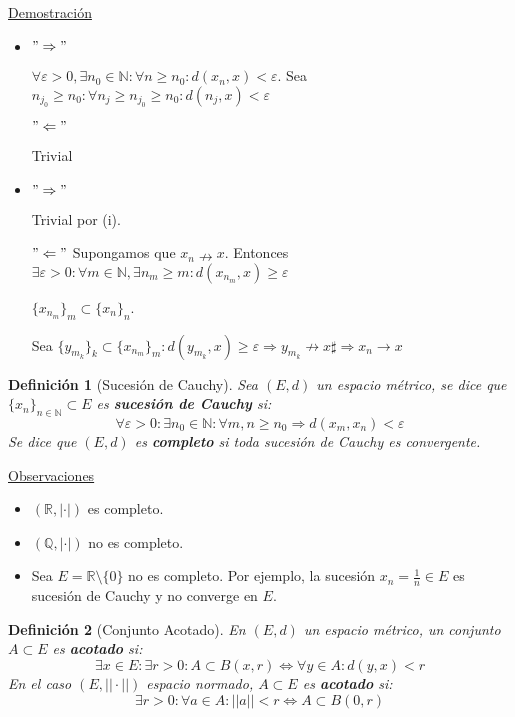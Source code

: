 \documentclass[10pt,a4paper,openright]{book}
\theoremstyle{break}
\newtheorem*{defi}{Definición}
\begin{document}
\underline{Demostración}
\begin{itemize}
\item $"\Rightarrow"$ 

$\forall \varepsilon > 0, \exists n_0 \in \mathbb{N} : \forall n \geq n_0 : d(x_n,x) < \varepsilon$. Sea $n_{j_0} \geq n_0 : \forall n_j \geq n_{j_0} \geq n_0 : d(n_{j}, x) < \varepsilon$

$"\Leftarrow"$

Trivial

\item  $"\Rightarrow"$

Trivial por (i).

$"\Leftarrow"$ Supongamos que $x_n  \nrightarrow x$. Entonces $\exists \varepsilon > 0 : \forall m \in \mathbb{N}, \exists n_m \geq m : d(x_{n_m}, x) \geq \varepsilon$

$\{x_{n_m}\}_m \subset \{x_n\}_n$.

Sea $\{y_{m_k}\}_k \subset \{x_{n_m}\}_m : d(y_{m_k}, x) \geq \varepsilon\Rightarrow y_{m_k} \nrightarrow x \sharp \Rightarrow x_n \rightarrow x$ 
 

\end{itemize}

\begin{defi}[Sucesión de Cauchy]
Sea $(E,d)$ un espacio métrico, se dice que $\{x_n\}_{n\in \mathbb{N}} \subset E$ es \textbf{sucesión de Cauchy} si:
$$\forall \varepsilon > 0: \exists n_0 \in \mathbb{N} : \forall m,n \geq n_0 \Rightarrow d(x_m, x_n) < \varepsilon$$
Se dice que $(E,d)$ es \textbf{completo} si toda sucesión de Cauchy es convergente.
\end{defi}

\underline{Observaciones}
\begin{itemize}
\item $(\mathbb{R}, |\cdot|)$ es completo.

\item $(\mathbb{Q}, |\cdot|)$ no es completo.

\item Sea $E = \mathbb{R} \setminus \{0\}$ no es completo. Por ejemplo, la sucesión $x_n = \frac{1}{n} \in E$ es sucesión de Cauchy y no converge en $E$.
\end{itemize}

\begin{defi}[Conjunto Acotado]
En $(E,d)$ un espacio métrico, un conjunto $A \subset E$ es \textbf{acotado} si:
$$\exists x \in E: \exists r > 0 : A \subset B(x,r) \Leftrightarrow \forall y \in A: d(y,x) < r$$
En el caso $(E, ||\cdot||)$ espacio normado, $A \subset E$ es \textbf{acotado} si:
$$\exists r > 0 : \forall a \in A: ||a|| < r  \Leftrightarrow A \subset B(0,r)$$
\end{defi}
\end{document}
